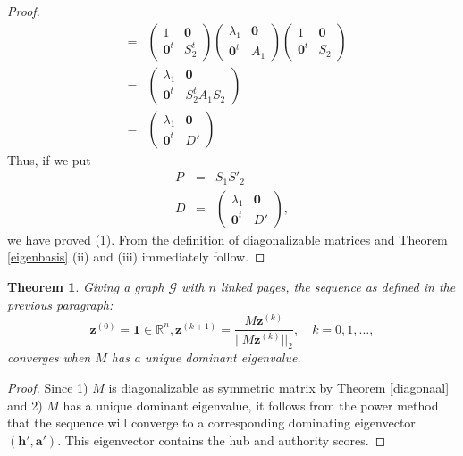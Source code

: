 \documentclass[a4paper,11pt]{report}
\newtheorem{theorem}{Theorem}[section]
\newcommand{\R}{{\mathbb R}}
\newcommand{\graf}{\mathscr{G}}
\begin{document}
\begin{proof}
\begin{eqnarray*}
&=& \left(
\begin{array}{c|c}
1 & \mathbf{0} \\ \hline
\mathbf{0}^t & S^t_2
\end{array}\right) 
\left(
\begin{array}{c|c}
\lambda_1 & \mathbf{0} \\ \hline
\mathbf{0}^t & A_1
\end{array}\right) 
 \left(
\begin{array}{c|c}
1 & \mathbf{0} \\ \hline
\mathbf{0}^t & S_2
\end{array}\right) \\
&=& 
 \left(
\begin{array}{c|c}
\lambda_1 & \mathbf{0} \\ \hline
\mathbf{0}^t & S^t_2A_1S_2
\end{array}\right) \\
&=&
 \left(
\begin{array}{c|c}
\lambda_1 & \mathbf{0} \\ \hline
\mathbf{0}^t & D'\end{array}\right) 
\end{eqnarray*}
Thus, if we put
\begin{eqnarray*}
P &=& S_1S'_2\\
D &=& \left(
\begin{array}{c|c}
\lambda_1 & \mathbf{0} \\ \hline
\mathbf{0}^t & D'\end{array}\right),
\end{eqnarray*}
we have proved (1). From the definition of diagonalizable matrices and Theorem \ref{eigenbasis} 
(ii) and (iii) immediately follow.
\end{proof}
 \begin{theorem}
   Giving a graph $\graf$ with $n$ linked pages, the sequence as defined in the previous paragraph: 
   $$\mathbf{z}^{(0)} = \mathbf{1} \in \R^{n}, \mathbf{z}^{(k+1)} = \frac{M\mathbf{z}^{(k)}}{||M\mathbf{z}^{(k)}||_2}, \quad k = 
  0,1,\ldots,$$
  converges when $M$ has a unique dominant eigenvalue.
 \end{theorem}
\begin{proof}
  Since 1) $M$ is diagonalizable as symmetric matrix by Theorem \ref{diagonaal}  
  and 2) $M$ has a unique dominant eigenvalue, it follows from the power method that
  the sequence will converge to a corresponding dominating eigenvector $(\mathbf{h'}, \mathbf{a'})$. This eigenvector contains the hub and authority scores.
  \end{proof}
\end{document}
